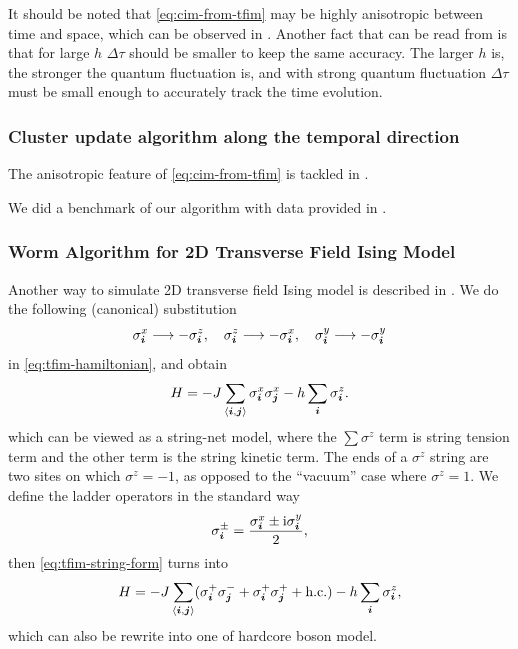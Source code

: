 \documentclass[hyperref, a4paper]{article}
\newcommand*{\ii}{\mathrm{i}}
\newcommand*{\pair}[1]{\langle #1 \rangle}
\newcommand*{\tfim}{transverse field Ising model }
\newcommand*{\TFIM}{Transverse Field Ising Model }
\begin{document}
It should be noted that \eqref{eq:cim-from-tfim} may be highly anisotropic between time and space, 
which can be observed in .
Another fact that can be read from  is that for large $h$ $\Delta \tau$ should be smaller to keep the same accuracy.
The larger $h$ is, the stronger the quantum fluctuation is, 
and with strong quantum fluctuation $\Delta \tau$ must be small enough to accurately track the time evolution.

\subsubsection{Cluster update algorithm along the temporal direction}

The anisotropic feature of \eqref{eq:cim-from-tfim} is tackled in \cite{Blte2002}.

We did a benchmark of our algorithm with data provided in \cite{Friedman_1978}.

\subsubsection{Worm Algorithm for 2D \TFIM}

Another way to simulate 2D \tfim is described in \cite{Huang_2020}.
We do the following (canonical) substitution
\begin{equation}
    \sigma_{\vb*{i}}^x \longrightarrow - \sigma^z_{\vb*{i}}, \quad \sigma_{\vb*{i}}^z \longrightarrow - \sigma^x_{\vb*{i}}, \quad \sigma^y_{\vb*{i}} \longrightarrow - \sigma^y_{\vb*{i}}
\end{equation}
in \eqref{eq:tfim-hamiltonian}, and obtain
\begin{equation}
    H = - J \sum_{\pair{\vb*{i}, \vb*{j}}} \sigma^x_{\vb*{i}} \sigma^x_{\vb*{j}} - h \sum_{\vb*{i}} \sigma^z_{\vb*{i}}.
    \label{eq:tfim-string-form}
\end{equation}
which can be viewed as a string-net model, where the $\sum \sigma^z$ term is string tension term and the other term is the string kinetic term.
The ends of a $\sigma^z$ string are two sites on which $\sigma^z = -1$, as opposed to the ``vacuum'' case where $\sigma^z = 1$.
We define the ladder operators in the standard way
\begin{equation}
    \sigma^\pm_{\vb*{i}} = \frac{\sigma^x_{\vb*{i}} \pm \ii \sigma^y_{\vb*{i}}}{2},
\end{equation}
then \eqref{eq:tfim-string-form} turns into
\begin{equation}
    H = - J \sum_{\pair{\vb*{i}, \vb*{j}}} (\sigma^+_{\vb*{i}} \sigma^-_{\vb*{j}} + \sigma^+_{\vb*{i}} \sigma^+_{\vb*{j}} + \text{h.c.}) - h \sum_{\vb*{i}} \sigma_{\vb*{i}}^z,
    \label{eq:tfim-string-fragments}
\end{equation}
which can also be rewrite into one of hardcore boson model.
\end{document}
